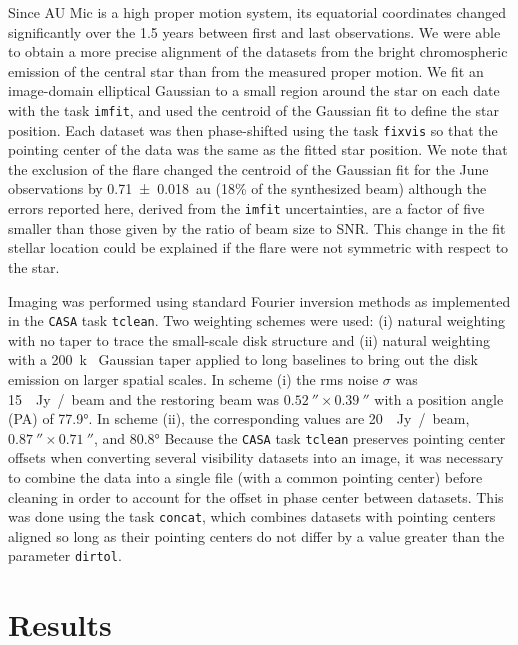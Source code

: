 \documentclass[12pt,oneside]{book}
\begin{document}
Since AU Mic is a high proper motion system, its equatorial coordinates changed significantly over the 1.5 years between first and last observations.  
We were able to obtain a more precise alignment of the datasets from the bright chromospheric emission of the central star than from the measured proper motion.
We fit an image-domain elliptical Gaussian to a small region around the star on each date with the task \texttt{imfit}, and used the centroid of the Gaussian fit to define the star position.
Each dataset was then phase-shifted using the task \texttt{fixvis} so that the pointing center of the data was the same as the fitted star position.
We note that the exclusion of the flare changed the centroid of the Gaussian fit for the June observations by \SI{0.71 \pm 0.018}{au} (18\% of the synthesized beam) although the errors reported here, derived from the \texttt{imfit} uncertainties, are a factor of five smaller than those given by the ratio of beam size to SNR.
This change in the fit stellar location could be explained if the flare were not symmetric with respect to the star.

Imaging was performed using standard Fourier inversion methods as implemented in the \texttt{CASA} task \texttt{tclean}. 
Two weighting schemes were used: (i) natural weighting with no taper to trace the small-scale disk structure and (ii) natural weighting with a \SI{200}{k\lambda} Gaussian taper applied to long baselines to bring out the disk emission on larger spatial scales. 
In scheme (i) the rms noise $\sigma$ was \SI{15}{\mu Jy / beam} and the restoring beam was $\SI{0.52}{\arcsecond} \times \SI{0.39}{\arcsecond}$ with a position angle (PA) of \ang[angle-symbol-over-decimal]{77.9}. 
In scheme (ii), the corresponding values are \SI{20}{\mu Jy / beam}, $\SI{0.87}{\arcsecond} \times \SI{0.71}{\arcsecond}$, and \ang[angle-symbol-over-decimal]{80.8}
Because the \texttt{CASA} task \texttt{tclean} preserves pointing center offsets when converting several visibility datasets into an image, it was necessary to combine the data into a single file (with a common pointing center) before cleaning in order to account for the offset in phase center between datasets. 
This was done using the task \texttt{concat}, which combines datasets with pointing centers aligned so long as their pointing centers do not differ by a value greater than the parameter \texttt{dirtol}.

\clearpage
\chapter{Results}
\label{chapter: results}
\end{document}
